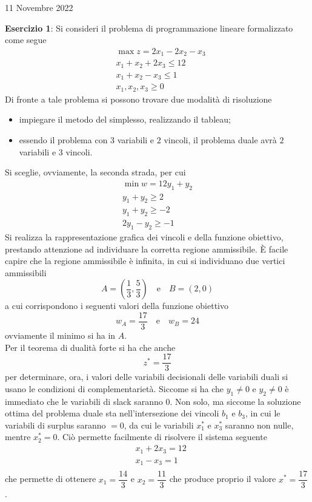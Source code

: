 \documentclass[a4paper]{extarticle}
\begin{document}
\newpage
\begin{center}
    11 Novembre 2022
\end{center}
\textbf{Esercizio 1}: Si consideri il problema di programmazione lineare formalizzato come segue
\begin{align*}
    &\max z = 2x_1 - 2x_2 - x_3\\
    &x_1 + x_2 + 2x_3 \leq 12\\
    &x_1+ x_2 -x_3 \leq 1\\
    &x_1,x_2,x_3 \geq 0
\end{align*}
Di fronte a tale problema si possono trovare due modalità di risoluzione
\begin{itemize}
    \item impiegare il metodo del simplesso, realizzando il tableau;
    \item essendo il problema con $3$ variabili e $2$ vincoli, il problema duale avrà $2$ variabili e $3$ vincoli.
\end{itemize}
Si sceglie, ovviamente, la seconda strada, per cui
\begin{align*}
    \min w = 12 y_1 + y_2\\
    y_1 + y_2 \geq 2\\
    y_1+y_2 \geq -2\\
    2y_1-y_2 \geq -1
\end{align*}
Si realizza la rappresentazione grafica dei vincoli e della funzione obiettivo, prestando attenzione ad individuare la corretta regione ammissibile. È facile capire che la regione ammissibile è infinita, in cui si individuano due vertici ammissibili
\[A=\left(\dfrac{1}{3},\dfrac{5}{3}\right) \hspace{1em} \text{e} \hspace{1em} B=(2,0)\]
a cui corrispondono i seguenti valori della funzione obiettivo
\[w_A=\dfrac{17}{3} \hspace{1em} \text{e} \hspace{1em} w_B=24\]
ovviamente il minimo si ha in $A$.\\
Per il teorema di dualità forte si ha che anche
\[z^*=\dfrac{17}{3}\]
per determinare, ora, i valori delle variabili decisionali delle variabili duali si usano le condizioni di complementarietà. Siccome si ha che $y_1 \neq 0$ e $y_2 \neq 0$ è immediato che le variabili di slack saranno $0$. Non solo, ma siccome la soluzione ottima del problema duale sta nell'intersezione dei vincoli $b_1$ e $b_3$, in cui le variabili di surplus saranno $=0$, da cui le variabili $x_1^*$ e $x_3^*$ saranno non nulle, mentre $x_2^*=0$. Ciò permette facilmente di risolvere il sistema seguente
\begin{align*}
    &x_1+ 2x_3 = 12\\
    &x_1-x_3 = 1\\
\end{align*}
che permette di ottenere $x_1=\dfrac{14}{3}$ e $x_2 = \dfrac{11}{3}$ che produce proprio il valore $x^*=\dfrac{17}{3}$.
\end{document}
